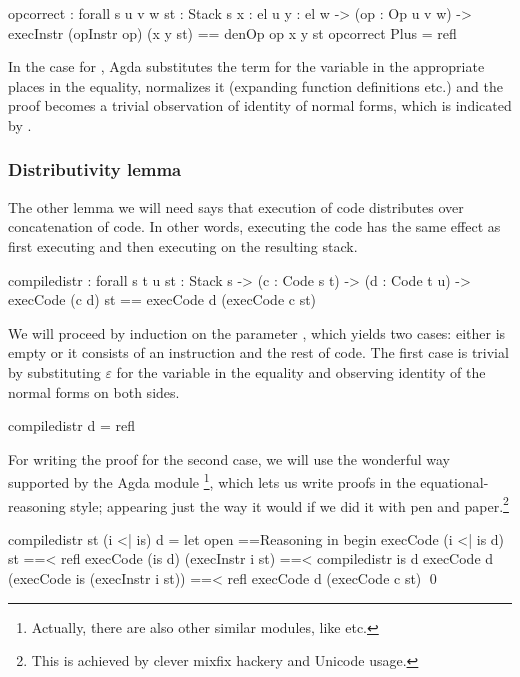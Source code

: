 \label{sec:cor-op-correct}\begin{code}
  op\-correct : forall {s u v w} {st : Stack s} {x : el u} {y : el w}
    -> (op : Op u v w)
    -> execInstr (opInstr op) (x \scons y \scons st) == denOp op x y \scons st
  op\-correct Plus = refl
\end{code}

\noindent In the case for , Agda substitutes the term 
for the variable  in the appropriate places in the equality, normalizes
it (expanding function definitions etc.) and the proof becomes a trivial observation of
identity of normal forms, which is indicated by .

\subsubsection{Distributivity lemma}

The other lemma we will need says that execution of code distributes over
concatenation of code. In other words, executing the code  has the same effect as first executing  and then executing
 on the resulting stack.

\label{sec:cor-compile-distr}\begin{code}
  compile\-distr : forall {s t u} {st : Stack s}
    -> (c : Code s t) -> (d : Code t u)
    -> execCode (c \app d) st == execCode d (execCode c st)
\end{code}

\noindent We will proceed by induction on the parameter , which yields
two cases: either  is empty or it consists of an instruction and the
rest of code. The first case is trivial by substituting $\varepsilon$ for the variable
 in the equality and observing identity of the normal forms on both sides.

\begin{code}
  compile\-distr \nil d = refl
\end{code}

\noindent For writing the proof for the second case, we will use the wonderful
way supported by the Agda module \footnote{Actually,
there are also other similar modules, like  etc.}, which
lets us write proofs in the equational-reasoning style; appearing just the way
it would if we did it with pen and paper.\footnote{This is achieved by clever
mixfix hackery and Unicode usage.}

\begin{code}
  compile\-distr {st} (i <| is) d = let open ==\-Reasoning in begin
    execCode (i <| is \app d) st
      ==< refl \>
    execCode (is \app d) (execInstr i st)
      ==< compile\-distr is d \>
    execCode d (execCode is (execInstr i st))
      ==< refl \>
    execCode d (execCode c st)
    \qed
\end{code}

